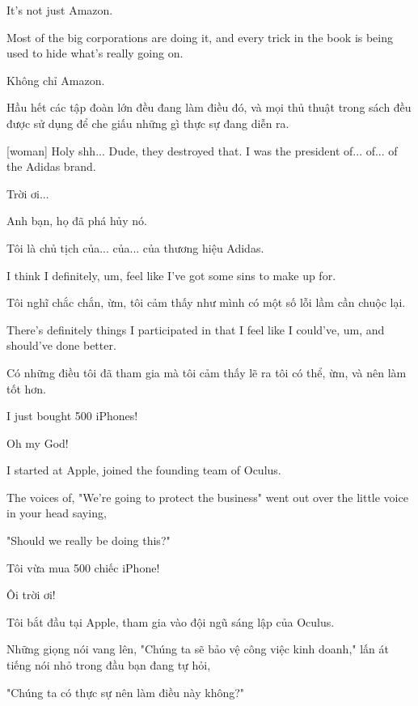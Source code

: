 \documentclass[a4paper]{article}
\begin{document}
	It's not just Amazon.
	
	Most of the big corporations are doing it, and every trick in the book is being used to hide what's really going on.
	
	\begin{vietnamese-v2}
		Không chỉ Amazon.
		
		Hầu hết các tập đoàn lớn đều đang làm điều đó, và mọi thủ thuật trong sách đều được sử dụng để che giấu những gì thực sự đang diễn ra.
	\end{vietnamese-v2}
	
	[woman] Holy shh...
	Dude, they destroyed that.
	I was the president of... of... of the Adidas brand.
	
	\begin{vietnamese-v2}
		 Trời ơi...
		
		Anh bạn, họ đã phá hủy nó.
		
		Tôi là chủ tịch của... của... của thương hiệu Adidas.
	\end{vietnamese-v2}
	
	
	I think I definitely, um, feel like I've got some sins to make up for.
	
	\begin{vietnamese-v2}
		Tôi nghĩ chắc chắn, ừm, tôi cảm thấy như mình có một số lỗi lầm cần chuộc lại.
	\end{vietnamese-v2}
	
	
	There's definitely things I participated in that I feel like I could've, um, and should've done better.
	
	\begin{vietnamese-v2}
		Có những điều tôi đã tham gia mà tôi cảm thấy lẽ ra tôi có thể, ừm, và nên làm tốt hơn.
	\end{vietnamese-v2}
	
	
	I just bought 500 iPhones!
	
	Oh my God!

	I started at Apple, joined the founding team of Oculus.

	The voices of, "We're going to protect the business" went out over the little voice in your head saying,

	"Should we really be doing this?"
	
	\begin{vietnamese-v2}
		Tôi vừa mua 500 chiếc iPhone!
		
		Ôi trời ơi!
		
		Tôi bắt đầu tại Apple, tham gia vào đội ngũ sáng lập của Oculus.
		
		Những giọng nói vang lên, "Chúng ta sẽ bảo vệ công việc kinh doanh," lấn át tiếng nói nhỏ trong đầu bạn đang tự hỏi,
		
		"Chúng ta có thực sự nên làm điều này không?"
	\end{vietnamese-v2}
	
\end{document}
